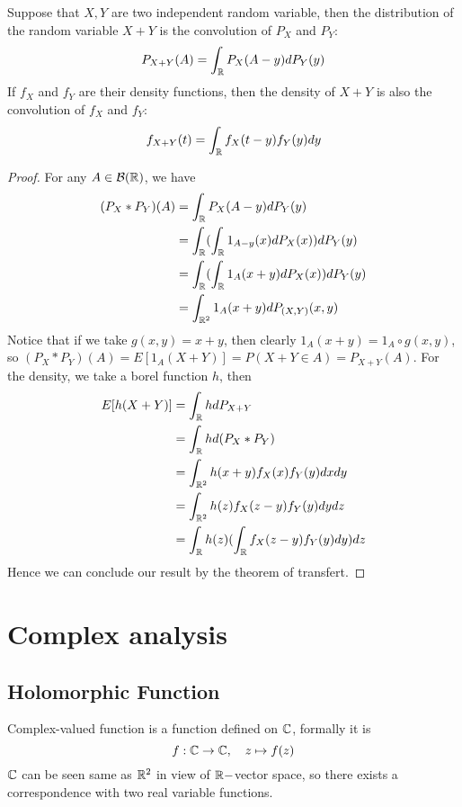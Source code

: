\documentclass[en,geye,blue,normal,12pt,bibend=bibtex]{elegantnote}
\begin{document}
\begin{proposition}[convolution]
    Suppose that \(X,Y\) are two independent random variable, then the distribution of the random variable \(X+Y\) is the convolution of \(P_X\) and \(P_Y\):
    \[P_{X+Y}(A) = \int_{\mathbb{R}} P_X(A-y)dP_Y(y)\]
    If \(f_X\) and \(f_Y\) are their density functions, then the density of \(X+Y\) is also the convolution of \(f_X\) and \(f_Y\):
    \[f_{X+Y}(t) = \int_{\mathbb{R}} f_X(t-y)f_Y(y)dy\]

    \begin{proof}
        For any \(A \in \mathcal{B}(\mathbb{R})\), we have
        \begin{align*}
            (P_X * P_Y)(A) &= \int_{\mathbb{R}} P_X(A-y)dP_Y(y) \\
            &= \int_{\mathbb{R}} (\int_{\mathbb{R}} 1_{A-y}(x) dP_X(x)) dP_Y(y) \\
            &= \int_{\mathbb{R}} (\int_{\mathbb{R}} 1_A(x+y)dP_X(x))dP_Y(y) \\
            &= \int_{\mathbb{R}^2} 1_A(x+y) dP_{(X,Y)}(x,y) 
        \end{align*}
        Notice that if we take \(g(x,y)=x+y\), then clearly \(1_A(x+y) = 1_A \circ g(x,y)\), so \((P_X * P_Y)(A) = E[1_A(X+Y)] = P(X+Y \in A) = P_{X+Y}(A)\). For the density, we take a borel function \(h\), then
        \begin{align*}
            E[h(X+Y)] &= \int_{\mathbb{R}} hdP_{X+Y}\\
            &= \int_{\mathbb{R}} hd(P_X *P_Y) \\
            &= \int_{\mathbb{R}^2}h(x+y)f_X(x)f_Y(y) dxdy \\
            &= \int_{\mathbb{R}^2}h(z)f_X(z-y)f_Y(y)dydz \\
            &= \int_{\mathbb{R}} h(z)(\int_{\mathbb{R}} f_X(z-y)f_Y(y)dy)dz
        \end{align*}
        Hence we can conclude our result by the theorem of transfert.
    \end{proof}
\end{proposition}



\section{Complex analysis}
\subsection{Holomorphic Function}
Complex-valued function is a function defined on \(\mathbb{C}\), formally it is 
\[f: \mathbb{C} \to \mathbb{C} , \quad z \mapsto f(z)\]
\(\mathbb{C}\) can be seen same as \(\mathbb{R}^2\) in view of \(\mathbb{R}-\)vector space, so there exists a correspondence with two real variable functions.
\end{document}
